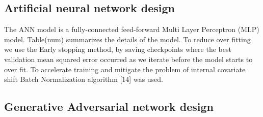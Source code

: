 \documentclass[draft, a4, 10pt, onecolumn]{IEEEtran}
\begin{document}
\subsection{Artificial neural network design}
\label{ssec:ann}
The ANN model is a fully-connected feed-forward Multi Layer Perceptron (MLP) model. Table(num) summarizes the details of the model. To reduce over fitting we use the Early stopping method, by saving checkpoints where the best validation mean squared error occurred as we iterate before the model starts to over fit. To accelerate training and mitigate the problem of internal covariate shift Batch Normalization algorithm [14] was used.

\begin{table}[h]
\centering
{}
\caption{Detailes of the ANN model}
\end{table}

\subsection{Generative Adversarial network design}
\label{ssec:gan}
\end{document}
